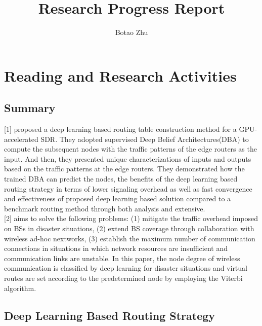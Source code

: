 \documentclass[11pt]{report}
\title{Research Progress Report}
\author{Botao Zhu}
\begin{document}
	
	\maketitle
	
	 \chead{} 
	 \cfoot{} 
	\renewcommand{\footrulewidth}{1.0pt}
	\renewcommand{\headrulewidth}{2.0pt}
	\renewcommand{\arraystretch}{1.3}
	\pagestyle{fancy}
	
	\renewcommand{\thesection}{\arabic{section}}
	
	\section{Reading and Research Activities}
	
	\subsection{Summary}
	[1] proposed a deep learning based routing table construction method for a GPU-accelerated SDR. They adopted supervised Deep Belief Architectures(DBA) to compute the subsequent nodes with the traffic patterns of the edge routers as the input. And then, they presented unique characterizations of inputs and outputs based on the traffic patterns at the edge routers. They demonstrated how the trained DBA can predict the nodes, the benefits of the deep learning based routing strategy in terms of lower signaling overhead as well as fast convergence and effectiveness of proposed deep learning based solution compared to a benchmark routing method through both analysis and extensive. \\
	
	[2] aims to solve the following problems: (1) mitigate the traffic overhead imposed on BSs in disaster situations, (2) extend BS coverage through collaboration with wireless ad-hoc nextworks, (3) establish the maximum number of communication connections in situations in which network resources are insufficient and communication links are unstable. In this paper, the node degree of wireless communication is classified by deep learning for disaster situations and virtual routes are set according to the predetermined node by employing the Viterbi algorithm.
	
	\subsection{Deep Learning Based Routing Strategy}
\end{document}
